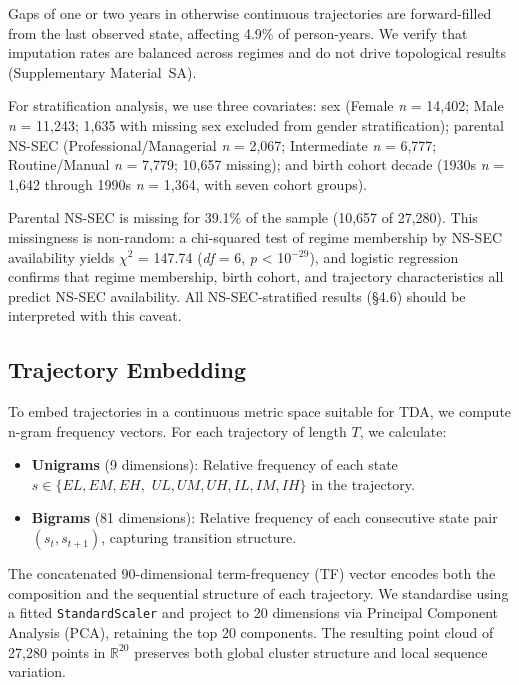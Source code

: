 Gaps of one or two years in otherwise continuous trajectories are forward-filled from the last observed state, affecting 4.9\% of person-years. We verify that imputation rates are balanced across regimes and do not drive topological results (Supplementary Material~SA).

For stratification analysis, we use three covariates: sex (Female \textit{n} = 14,402; Male \textit{n} = 11,243; 1,635 with missing sex excluded from gender stratification); parental NS-SEC (Professional/Managerial \textit{n} = 2,067; Intermediate \textit{n} = 6,777; Routine/Manual \textit{n} = 7,779; 10,657 missing); and birth cohort decade (1930s \textit{n} = 1,642 through 1990s \textit{n} = 1,364, with seven cohort groups).

Parental NS-SEC is missing for 39.1\% of the sample (10,657 of 27,280). This missingness is non-random: a chi-squared test of regime membership by NS-SEC availability yields $\chi^2$ = 147.74 (\textit{df} = 6, \textit{p} < 10$^{-29}$), and logistic regression confirms that regime membership, birth cohort, and trajectory characteristics all predict NS-SEC availability. All NS-SEC-stratified results (\S4.6) should be interpreted with this caveat.

\subsection{Trajectory Embedding}

To embed trajectories in a continuous metric space suitable for TDA, we compute n-gram frequency vectors. For each trajectory of length $T$, we calculate:

\begin{itemize}
  \item \textbf{Unigrams} (9 dimensions): Relative frequency of each state $s \in \{EL, EM, EH,$ $UL, UM, UH, IL, IM, IH\}$ in the trajectory.
  \item \textbf{Bigrams} (81 dimensions): Relative frequency of each consecutive state pair $(s_t, s_{t+1})$, capturing transition structure.
\end{itemize}

The concatenated 90-dimensional term-frequency (TF) vector encodes both the composition and the sequential structure of each trajectory. We standardise using a fitted \texttt{StandardScaler} and project to 20 dimensions via Principal Component Analysis (PCA), retaining the top 20 components. The resulting point cloud of 27,280 points in $\mathbb{R}^{20}$ preserves both global cluster structure and local sequence variation.

